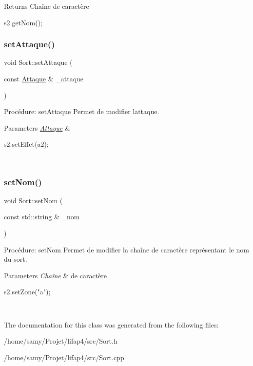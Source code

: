 \begin{DoxyReturn}{Returns}
Chaîne de caractère 
\begin{DoxyCode}
s2.getNom();
\end{DoxyCode}
 
\end{DoxyReturn}
\mbox{\label{classSort_ae8380b142e31fdad8afae89bbfaeffc5}} 
\subsubsection{\texorpdfstring{set\+Attaque()}{setAttaque()}}
{\footnotesize\ttfamily void Sort\+::set\+Attaque (\begin{DoxyParamCaption}\item[{const \hyperlink{classAttaque}{Attaque} \&}]{\+\_\+attaque }\end{DoxyParamCaption})}



Procédure\+: set\+Attaque Permet de modifier l\textquotesingle{}attaque. 


\begin{DoxyParams}{Parameters}
{\em \hyperlink{classAttaque}{Attaque}} & 
\begin{DoxyCode}
s2.setEffet(a2);
\end{DoxyCode}
 \\
\hline
\end{DoxyParams}
\mbox{\label{classSort_af1eb5e9ab593b1c6b9e1d94ad1117b4f}} 
\subsubsection{\texorpdfstring{set\+Nom()}{setNom()}}
{\footnotesize\ttfamily void Sort\+::set\+Nom (\begin{DoxyParamCaption}\item[{const std\+::string \&}]{\+\_\+nom }\end{DoxyParamCaption})}



Procédure\+: set\+Nom Permet de modifier la chaîne de caractère représentant le nom du sort. 


\begin{DoxyParams}{Parameters}
{\em Chaîne} & de caractère 
\begin{DoxyCode}
s2.setZone(\textcolor{stringliteral}{"a"});
\end{DoxyCode}
 \\
\hline
\end{DoxyParams}


The documentation for this class was generated from the following files\+:\begin{DoxyCompactItemize}
\item 
/home/samy/\+Projet/lifap4/src/Sort.\+h\item 
/home/samy/\+Projet/lifap4/src/Sort.\+cpp\end{DoxyCompactItemize}
